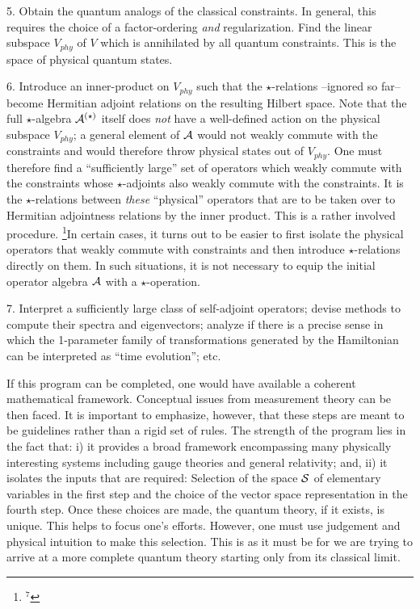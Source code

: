 \item{5.} Obtain the quantum analogs of the classical constraints. In general,
this requires the choice of a factor-ordering {\it and} regularization. Find
the linear subspace $V_{phy}$ of $V$ which is annihilated by all quantum
constraints. This is the space of physical quantum states.
\item{6.} Introduce an inner-product on $V_{phy}$ such that the
$\star$-relations --ignored so far-- become Hermitian adjoint relations on
the resulting Hilbert space. Note that the full $\star$-algebra
${\cal A}^{(\star)}$ itself does {\it not} have a well-defined action on the
physical subspace $V_{phy}$; a general element of ${\cal A}$ would not weakly
commute with the constraints and would therefore throw physical states out
of $V_{phy}$. One must therefore find a ``sufficiently large'' set of
operators which weakly commute with the constraints whose $\star$-adjoints
also weakly commute with the constraints. It is the $\star$-relations between
{\it these} ``physical'' operators that are to be taken over to Hermitian
adjointness relations by the inner product. This is a rather involved
procedure.%
\footnote{$^7$}{In certain cases, it turns out to be easier to first isolate
the physical operators that weakly commute with constraints and then
introduce $\star$-relations directly on them. In such situations, it is
not necessary to equip the initial operator algebra ${\cal A}$ with a
$\star$-operation.}
\item{7.} Interpret a sufficiently large class of self-adjoint operators;
devise methods to compute their spectra and eigenvectors; analyze if there is
a precise sense in which the 1-parameter family of transformations generated
by the Hamiltonian can be interpreted as ``time evolution''; etc.

If this program can be completed, one would have available a coherent
mathematical framework. Conceptual issues from measurement theory can
be then faced. It is important to emphasize, however, that these steps
are meant to be guidelines rather than a rigid set of rules. The strength
of the program lies in the fact that: i) it provides a broad framework
encompassing many physically interesting systems including gauge theories and
general relativity; and, ii) it isolates the inputs that are required:
Selection of the space ${\cal S}$ of elementary variables in the first step
and the choice of the vector space representation in the fourth step. Once
these choices are made, the quantum theory, if it exists, is unique. This
helps to focus one's efforts. However, one must use judgement and physical
intuition to make this selection. This is as it must be for we are trying
to arrive at a more complete quantum theory starting only from its classical
limit.

